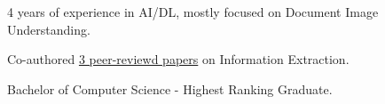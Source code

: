 
\begin{zitemize}
    \item 4 years of experience in AI/DL, mostly focused on Document Image Understanding.
    \item Co-authored \href{https://scholar.google.com/citations?user=iRZlaI8AAAAJ}{3 peer-reviewd papers} on Information Extraction.
    \item Bachelor of Computer Science - Highest Ranking Graduate.
\end{zitemize}
